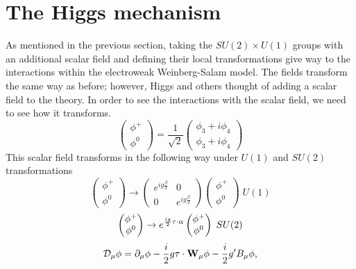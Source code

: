 \section{The Higgs mechanism}
As mentioned in the previous section, taking the $SU(2) \times U(1)$ groups with an additional scalar field and defining their local transformations give way to the interactions within the electroweak Weinberg-Salam model. The fields transform the same way as before; however, Higgs and others thought of adding a scalar field to the theory. In order to see the interactions with the scalar field, we need to see how it transforms. 
\begin{equation}\begin{pmatrix}\phi^+ \\ \phi^0\end{pmatrix} = \frac{1}{\sqrt{2}}\begin{pmatrix} \phi_3 + i\phi_4 \\ \phi_3 + i\phi_4\end{pmatrix}  \end{equation}
This scalar field transforms in the following way under $U(1)$ and $SU(2)$ transformations 
\begin{equation}\begin{pmatrix}\phi^+ \\ \phi^0\end{pmatrix} \rightarrow \begin{pmatrix} e^{ig\frac{\beta}{2}} & 0 \\ 0 & e^{ig\frac{\beta}{2}}\end{pmatrix}\begin{pmatrix}\phi^+ \\ \phi^0\end{pmatrix} \; U(1) \end{equation}
\begin{equation}\begin{pmatrix}\phi^+ \\ \phi^0\end{pmatrix} \rightarrow e^{\frac{ig}{2}\bold{\tau}\cdot\bold{\alpha}}    \begin{pmatrix}\phi^+ \\ \phi^0\end{pmatrix} \; SU(2) \end{equation}
\begin{equation}\mathcal{D}_\mu \phi = \partial_\mu \phi - \frac{i}{2}g\bold{\tau}\cdot\bold{W}_\mu \phi - \frac{i}{2}g'B_\mu\phi \text{,}\end{equation}
